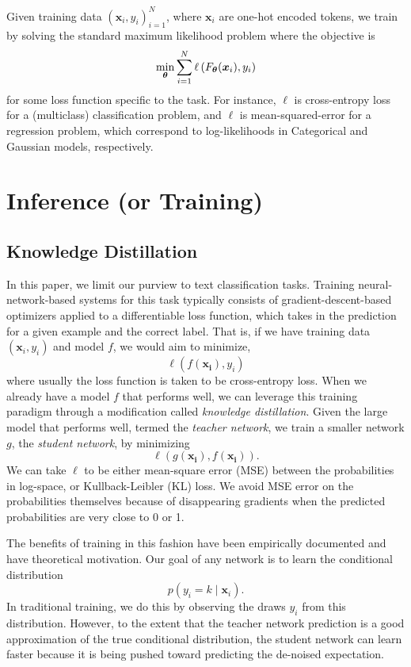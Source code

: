 \documentclass[10pt]{article}
\newcommand{\btheta}{{\bm{\theta}}}
\begin{document}
Given training data $(\bm x_i, y_i)_{i=1}^N$, where $\bm x_i$ are one-hot
encoded tokens, we train by solving the standard maximum likelihood problem
where the objective is \[
\min_{\btheta} \sum_{i=1}^N \ell\pr{F_\btheta(\bm x_i), y_i}
\]
for some loss function specific to the task. For instance, $\ell$ is
cross-entropy loss for a (multiclass) classification problem, and $\ell$ is
mean-squared-error for a regression problem, which correspond to
log-likelihoods in Categorical and Gaussian models, respectively. 



\section{Inference (or Training)}
\label{sec:training}


\subsection{Knowledge Distillation}
\label{subsec:kd}

In this paper, we limit our purview to text classification tasks. Training
neural-network-based systems for this task typically consists of
gradient-descent-based optimizers applied to a differentiable loss
function, which takes in the prediction for a given example and the correct label. That is, if we have
training data $(\bm{x}_i, y_i)$ and model $f$, we would aim to minimize,
\[ \ell(f(\bm{x_i}), y_i)\]
where usually the loss function is taken to be cross-entropy loss. When we
already have a model $f$ that performs well, we can leverage this training
paradigm through a modification called \emph{knowledge distillation}. Given
the large model that performs well, termed the \emph{teacher network}, we
train a smaller network $g$, the \emph{student network}, by minimizing
\[ \ell(g(\bm{x_i}), f(\bm{x_i})).\]
We can take
$\ell$ to be either mean-square error (MSE) between the probabilities in
log-space, or Kullback-Leibler (KL) loss. We avoid MSE error on the
probabilities themselves because of disappearing gradients when the predicted
probabilities are very close to 0 or 1.

The benefits of training in this fashion have been empirically documented
\citep{hinton2015distilling} and have theoretical motivation. Our goal of any
network is to learn the conditional distribution 
\[ p(y_i = k \mid \bm{x}_i).\]
In traditional training, we do this by observing the draws $y_i$ from this
distribution. However, to the extent that the teacher network prediction is a
good approximation of the true conditional distribution, the student network
can learn faster because it is being pushed toward predicting the de-noised
expectation.
\end{document}
